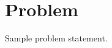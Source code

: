 \documentclass{article}
\begin{document}
\section*{Problem}
Sample problem statement.
\end{document}
